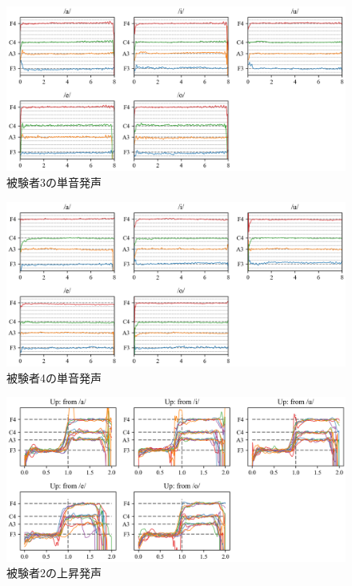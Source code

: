 \documentclass[10.5ptj,a4j,dvipdfmx,uplatex, oneside, openany, report]{jsbook}%
\begin{document}
\begin{figure}[htbp]
    \begin{center}
      \includegraphics[clip,width=16.0cm]{F0_long_3.png}
      \caption{被験者3の単音発声}
      \label{fig:3}
    \end{center}

\end{figure}

\begin{figure}[htbp]
    \begin{center}
      \includegraphics[clip,width=16.0cm]{F0_long_4.png}
      \caption{被験者4の単音発声}
      \label{fig:4}
    \end{center}
\end{figure}





\begin{figure}[htbp]
    \begin{center}
      \includegraphics[clip,width=16.0cm]{F0_up_2.png}
      \caption{被験者2の上昇発声}
      \label{fig:u2}
    \end{center}
\end{figure}
\end{document}
